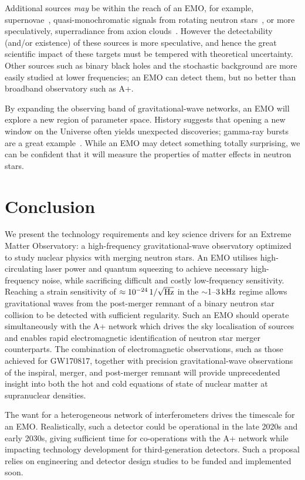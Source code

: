 \documentclass[prx,superscriptaddress,twocolumn,nopreprintnumbers,floatfix,nofootinbib]{revtex4}
\begin{document}
Additional sources {\em may} be within the reach of an EMO, for example, supernovae~\cite[e.g.,][]{powell19}, quasi-monochromatic signals from rotating neutron stars~\cite[e.g.,][]{lasky15,riles17}, or more speculatively, superradiance from axion clouds~\cite{yoshino14}.
However the detectability (and/or existence) of these sources is more speculative, and hence the great scientific impact of these targets must be tempered with theoretical uncertainty.
Other sources such as binary black holes and the stochastic background are more easily studied at lower frequencies; an EMO can detect them, but no better than broadband observatory such as A+.

By expanding the observing band of gravitational-wave networks, an EMO will explore a new region of parameter space.
History suggests that opening a new window on the Universe often yields unexpected discoveries; gamma-ray bursts are a great example~\cite{grb1977}.
While an EMO may detect something totally surprising, we can be confident that it will measure the properties of matter effects in neutron stars.

\section{Conclusion}\label{sec:conclusion}
We present the technology requirements and key science drivers for an Extreme Matter Observatory: a high-frequency gravitational-wave observatory optimized to study nuclear physics with merging neutron stars.  An EMO utilises high-circulating laser power and quantum squeezing to achieve necessary high-frequency noise, while sacrificing difficult and costly low-frequency sensitivity.  Reaching a strain sensitivity of $\approx\unit[10^{-24}]{1/\sqrt{Hz}}$ in the $\sim$1--$\unit[3]{kHz}$ regime allows gravitational waves from the post-merger remnant of a binary neutron star collision to be detected with sufficient regularity.  Such an EMO should operate simultaneously with the A+ network which drives the sky localisation of sources and enables rapid electromagnetic identification of neutron star merger counterparts.  The combination of electromagnetic observations, such as those achieved for GW170817, together with precision gravitational-wave observations of the inspiral, merger, \textrm{and} post-merger remnant will provide unprecedented insight into both the \textrm{hot} and cold equations of state of nuclear matter at supranuclear densities.

The want for a heterogeneous network of interferometers drives the timescale for an EMO. Realistically, such a detector could be operational in the late 2020s and early 2030s, giving sufficient time for co-operations with the A+ network while impacting technology development for third-generation detectors.  Such a proposal relies on engineering and detector design studies to be funded and implemented soon.
\end{document}
